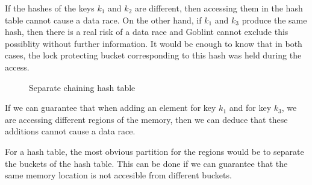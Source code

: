 \documentclass[..thesis.tex]{subfiles}
\begin{document}
If the hashes of the keys $k_1$ and $k_2$ are different, then accessing them in the hash table cannot cause a data race.
On the other hand, if $k_1$ and $k_3$ produce the same hash, then there is a real risk of a data race and Goblint cannot exclude this possiblity without further information.
It would be enough to know that in both cases, the lock protecting bucket corresponding to this hash was held during the access.

\begin{figure}[H]
  \centering
  \caption{Separate chaining hash table} 
\end{figure}


If we can guarantee that when adding an element for key $k_1$ and for key $k_3$,
we are accessing different regions of the memory, then we can deduce that these additions cannot cause a data race.

For a hash table, the most obvious partition for the regions would be to separate the buckets of the hash table.
This can be done if we can guarantee that the same memory location is not accesible from different buckets.
\end{document}
